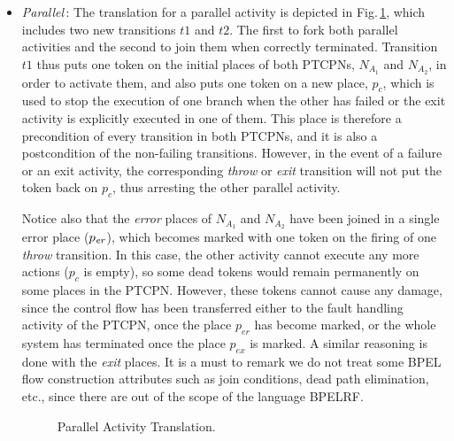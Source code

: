 \begin{itemize}
\item {\it Parallel}\,: The translation for a parallel activity is depicted
in Fig.\,\ref{par}, which includes two new transitions $t1$ and
$t2$. The first to fork both parallel activities
and the second to join them when correctly terminated. 
Transition $t1$ thus puts one token on the initial places of both
PTCPNs, $N_{A_1}$ and $N_{A_2}$, in order to activate them,
and also puts one token on a new place, $p_c$, which is
used to stop the execution of one branch when the other has
failed or the exit activity is explicitly executed in one of them.
This place is therefore a precondition of every 
transition in both PTCPNs, and it is also a postcondition
of the non-failing transitions. However, in the event
of a failure or an exit activity, the corresponding {\em throw} or {\em exit}  transition
will not put the token back on $p_c$, thus
arresting the other parallel activity.

Notice also that the {\em error} places of ${N}_{A_{1}}$ and $N_{A_{2}}$
have been joined in a single error place ($p_{\it er}$),
which becomes marked with one token on
the firing of one {\em throw} transition. 
In this case, the other activity cannot execute any
more actions ($p_c$ is empty), so some dead tokens would
remain permanently on some places in the PTCPN.
However, these tokens cannot cause
any damage, since the control flow has been
transferred either to the fault handling activity of the PTCPN, 
once the place $p_{er}$ has become marked, or the whole system has terminated once 
the place $p_{ex}$ is marked. A similar reasoning is done with the {\em exit} places.
It is a must to remark we do not treat 
some BPEL flow construction attributes such as join conditions,
dead path elimination, etc., since there are out of the scope of the language BPELRF.

\begin{figure}[!ht]
\begin{center}
\end{center}
\caption{\label{par} Parallel Activity Translation.}
\end{figure}


\end{itemize}
